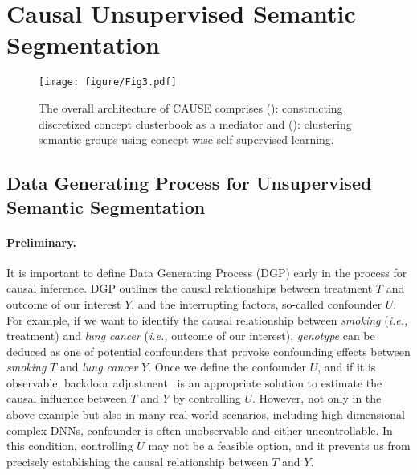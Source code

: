 \documentclass{article} \usepackage{iclr2024_conference,times}
\begin{document}
\section{Causal Unsupervised Semantic Segmentation}
\label{sec:3}

\begin{figure*}[t]
\vspace{-13mm}
\centering
\texttt{[image: figure/Fig3.pdf]}
\vspace*{-3mm}
\caption{The overall architecture of CAUSE comprises (\lowercase\expandafter{}): constructing discretized concept clusterbook as a mediator and (\lowercase\expandafter{}): clustering semantic groups using concept-wise self-supervised learning.}
\vspace{-5mm}
\label{fig:3}
\end{figure*}


\subsection{Data Generating Process for Unsupervised Semantic Segmentation}
\label{sec:dgp}
\paragraph{Preliminary.} It is important to define Data Generating Process (DGP) early in the process for causal inference. DGP outlines the causal relationships between treatment $T$ and outcome of our interest $Y$, and the interrupting factors, so-called confounder $U$. For example, if we want to identify the causal relationship between \textit{smoking} (\textit{i.e.,} treatment) and \textit{lung cancer} (\textit{i.e.,} outcome of our interest), \textit{genotype} can be deduced as one of potential confounders that provoke confounding effects between \textit{smoking} $T$ and \textit{lung cancer} $Y$.
Once we define the confounder $U$, and if it is observable, backdoor adjustment~\citep{pearl1993bayesian} is an appropriate solution to estimate the causal influence between $T$ and $Y$ by controlling $U$. However, not only in the above example but also in many real-world scenarios, including high-dimensional complex DNNs, confounder is often unobservable and either uncontrollable. In this condition, controlling $U$ may not be a feasible option, and it prevents us from precisely establishing the causal relationship between $T$ and $Y$.
\end{document}
